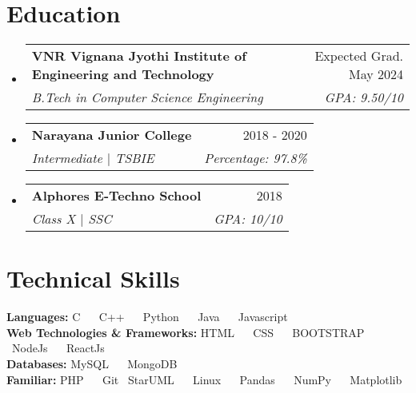 \documentclass[letterpaper,11pt]{article}
\makeatletter
\newcommand{\resumeItem}[1]{
  \item\small{
    {#1 \vspace{-2pt}}
  }
}
\newcommand{\resumeSubheading}[4]{
  \vspace{-2pt}\item
    \begin{tabular*}{0.97\textwidth}[t]{l@{\extracolsep{\fill}}r}
      \textbf{#1} & #2 \\
      \textit{\small#3} & \textit{\small #4} \\
    \end{tabular*}\vspace{-9pt}
}
\newcommand{\resumeSubHeadingListStart}{\begin{itemize}[leftmargin=0.15in, label={}]}
\newcommand{\resumeSubHeadingListEnd}{\end{itemize}}
\newcommand{\resumeItemListStart}{\begin{itemize}}
\newcommand{\resumeItemListEnd}{\end{itemize}\vspace{-6pt}}
\makeatother
\begin{document}
\section{Education}
  \resumeSubHeadingListStart
    \resumeSubheading
      {VNR Vignana Jyothi Institute of Engineering and Technology}{Expected Grad. May 2024}
      {B.Tech in Computer Science Engineering}{GPA: 9.50/10}
    \resumeSubheading
      {Narayana Junior College}{2018 - 2020}
      {Intermediate $|$ TSBIE}{Percentage: 97.8\% }
    \resumeSubheading
      {Alphores E-Techno School}{2018}
      {Class X $|$ SSC}{GPA: 10/10 }
  \resumeSubHeadingListEnd

\section{Technical Skills}
 \begin{itemize}[leftmargin=0.15in, label={}]
    \small{\item{
     \textbf{Languages: }{ 
            C \ \textbullet{}  \ C++ \ \textbullet{} \ Python \ \textbullet{} \ Java \  \textbullet{} \ Javascript
            \\}
        \vspace{3pt}      
     \textbf{Web Technologies \& Frameworks: }{ HTML \  \textbullet{} \ CSS
     \ \textbullet{} \ BOOTSTRAP \  \textbullet{} \ NodeJs \ \textbullet{} \ ReactJs} \\
     \vspace{3pt}
     \textbf{Databases: }{ MySQL \  \textbullet{} \ MongoDB   } \\
     \vspace{3pt}
     \textbf{Familiar: }{ PHP \  \textbullet{} \ Git \textbullet{} \ StarUML \ \textbullet{} \ Linux \ \textbullet{} \ Pandas \ \textbullet{} \ NumPy \ \textbullet{} \ Matplotlib}
    }}
 \end{itemize}


      
\end{document}
